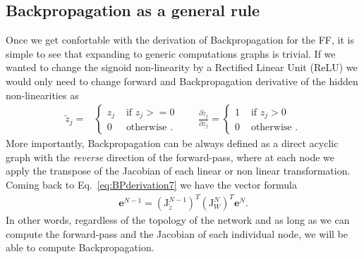\subsection{Backpropagation as a general rule}
%
Once we get confortable with the derivation of Backpropagation for the FF, it is simple to see that expanding to generic computations graphs is trivial. If we wanted to change the signoid non-linearity by a Rectified Linear Unit (ReLU) we would only need to change forward and Backpropagation derivative of the hidden non-linearities as
\begin{align}
 \tilde{z}_j =
  &\begin{cases}
      z_j  &  \mbox{ if } z_j >= 0\\
      0  &  \mbox{ otherwise }.
  \end{cases} \quad \quad \frac{\partial \tilde{z}_{j}}{\partial z_{j}} = \begin{cases}
      1  &  \mbox{ if } z_j > 0\\
      0  &  \mbox{ otherwise }.
  \end{cases}
  \label{eqn:relu}
\end{align}
%
More importantly, Backpropagation can be always defined as a direct acyclic graph with the \textit{reverse} direction of the forward-pass, where at each node we apply the transpose of the Jacobian of each linear or non linear transformation. Coming back to Eq.~\ref{eq:BPderivation7} we have the vector formula
%
\begin{align}
        \mathbf{e}^{N-1} = \left(\mathbf{\mathrm{J}}_{\tilde{z}}^{N-1}\right)^T \left(\mathbf{\mathrm{J}}_{W}^N\right)^T \mathbf{e}^N.
\label{eq:BPderivation5}
\end{align}
%
In other words, regardless of the topology of the network and as long as we can compute the forward-pass and the Jacobian of each individual node, we will be able to compute Backpropagation.
